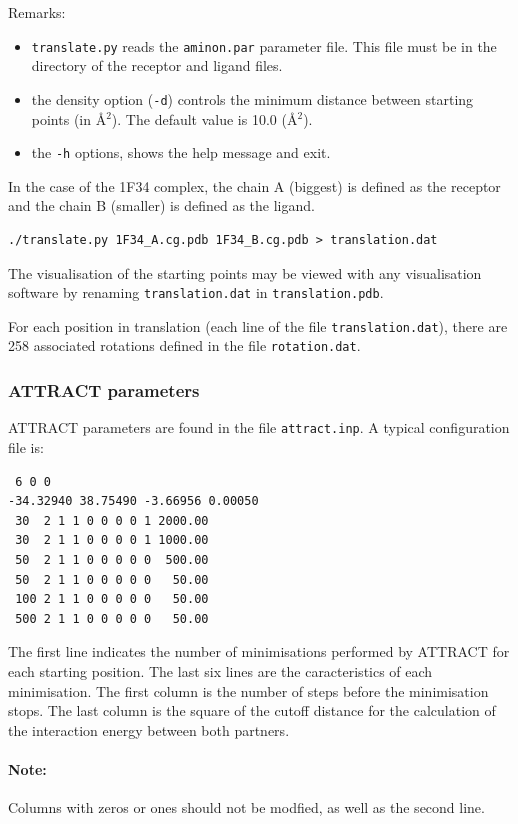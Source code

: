 \documentclass[12pt,a4paper]{article}
\begin{document}
Remarks:
\begin{itemize}
\item {\tt translate.py} reads the {\tt aminon.par} parameter file. This file must be
in the directory of the receptor and ligand files.
\item the density option ({\tt -d}) controls the minimum distance between starting
points (in \AA$^2$). The default value is 10.0 (\AA$^2$). 
\item the {\tt -h} options, shows the help message and exit.
\end{itemize}

In the case of the 1F34 complex, the chain A (biggest) is defined as the receptor
and the chain B (smaller) is defined as the ligand.
\begin{verbatim}
./translate.py 1F34_A.cg.pdb 1F34_B.cg.pdb > translation.dat
\end{verbatim}

The visualisation of the starting points may be viewed with any visualisation software by renaming {\tt translation.dat} in {\tt translation.pdb}.

For each position in translation (each line of the file {\tt translation.dat}), 
there are 258 associated rotations defined in the file {\tt rotation.dat}. 

\subsubsection{ATTRACT parameters}

ATTRACT parameters are found in the file {\tt attract.inp}. A typical configuration file is:
\begin{verbatim}
 6 0 0
-34.32940 38.75490 -3.66956 0.00050
 30  2 1 1 0 0 0 0 1 2000.00
 30  2 1 1 0 0 0 0 1 1000.00
 50  2 1 1 0 0 0 0 0  500.00
 50  2 1 1 0 0 0 0 0   50.00
 100 2 1 1 0 0 0 0 0   50.00
 500 2 1 1 0 0 0 0 0   50.00
\end{verbatim}

The first line indicates the number of minimisations performed by ATTRACT for each starting position. 
The last six lines are the caracteristics of each minimisation. The first column is the number of steps before the minimisation stops. 
The last column is the square of the cutoff distance for the calculation of the interaction energy between both partners.

\paragraph{Note:} Columns with zeros or ones should not be modfied, as well as the second line.
\end{document}
